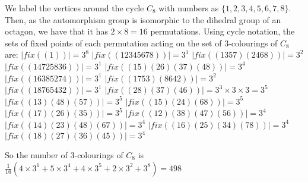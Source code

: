 We label the vertices around the cycle $C_8$
with numbers as $\{ 1,2,3,4,5,6,7,8 \}$.
Then, as the automorphism group is isomorphic to the dihedral
group of an octagon, we have that it has $2 \times 8 = 16$ permutations.
Using cycle notation, the sets of fixed points of each permutation
acting on the set of 3-colourings of $C_8$ are:
$|fix((1))| = 3^8$
$|fix((12345678))| = 3^1$
$|fix((1357)(2468))| = 3^2$
$|fix((14725836))| = 3^1$
$|fix((15)(26)(37)(48))| = 3^4$
$|fix((16385274))| = 3^1$
$|fix((1753)(8642))| = 3^2$
$|fix((18765432))| = 3^1$
$|fix((28)(37)(46))| = 3^3 \times 3 \times 3 = 3^5$
$|fix((13)(48)(57))| = 3^5$
$|fix((15)(24)(68))| = 3^5$
$|fix((17)(26)(35))| = 3^5$
$|fix((12)(38)(47)(56))| = 3^4$
$|fix((14)(23)(48)(67))| = 3^4$
$|fix((16)(25)(34)(78))| = 3^4$
$|fix((18)(27)(36)(45))| = 3^4$

So the number of 3-colourings of $C_8$ is 
$\frac{1}{16} \left(4 \times 3^1 + 5 \times 3^4 + 4 \times 3^5 + 2 \times 3^2 + 3^8\right) = 498$
